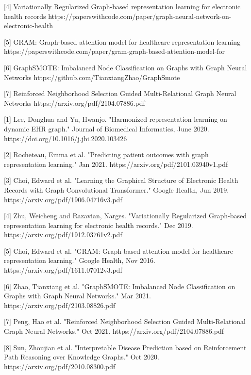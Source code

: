 \documentclass{article}
\begin{document}
[4] Variationally Regularized Graph-based representation learning for electronic health records
https://paperswithcode.com/paper/graph-neural-network-on-electronic-health

[5] GRAM: Graph-based attention model for healthcare representation learning
https://paperswithcode.com/paper/gram-graph-based-attention-model-for

[6] GraphSMOTE: Imbalanced Node Classification on Graphs with Graph Neural Networks
https://github.com/TianxiangZhao/GraphSmote

[7] Reinforced Neighborhood Selection Guided Multi-Relational Graph Neural Networks 
https://arxiv.org/pdf/2104.07886.pdf


[1] Lee, Donghua and Yu, Hwanjo. "Harmonized representation learning on dynamic EHR graph." Journal of Biomedical Informatics, June 2020. https://doi.org/10.1016/j.jbi.2020.103426

[2] Rocheteau, Emma et al. "Predicting patient outcomes with graph representation learning." Jan 2021. https://arxiv.org/pdf/2101.03940v1.pdf


[3] Choi, Edward et al. "Learning the Graphical Structure of Electronic Health Records with Graph Convolutional Transformer." Google Health, Jun 2019. https://arxiv.org/pdf/1906.04716v3.pdf

[4] Zhu, Weicheng and Razavian, Narges. "Variationally Regularized Graph-based representation learning for electronic health records." Dec 2019. https://arxiv.org/pdf/1912.03761v2.pdf

[5] Choi, Edward et al. "GRAM: Graph-based attention model for healthcare representation learning." Google Health, Nov 2016. https://arxiv.org/pdf/1611.07012v3.pdf

[6] Zhao, Tianxiang et al. "GraphSMOTE: Imbalanced Node Classification on Graphs with Graph Neural Networks." Mar 2021. https://arxiv.org/pdf/2103.08826.pdf

[7] Peng, Hao et al. "Reinforced Neighborhood Selection Guided Multi-Relational Graph Neural Networks." Oct 2021. https://arxiv.org/pdf/2104.07886.pdf

[8] Sun, Zhoujian et al. "Interpretable Disease Prediction based on Reinforcement Path Reasoning over Knowledge Graphs." Oct 2020. https://arxiv.org/pdf/2010.08300.pdf
\end{document}
